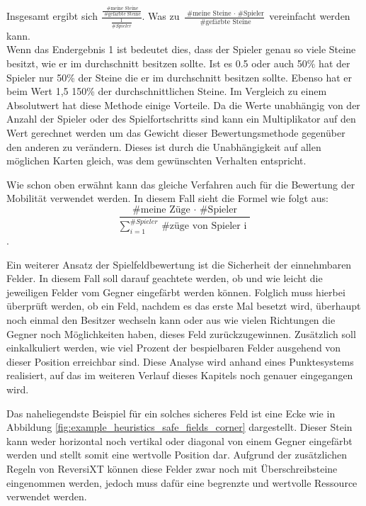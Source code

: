 \documentclass[12pt,a4paper,bibliography=totocnumbered,listof=totocnumbered]{article}
\begin{document}
Insgesamt ergibt sich
\( \frac{ \frac{\text{ \# meine Steine}}{\text{ \# gefärbte Steine}} }{ \frac{1}{ \# Spieler} } \).
Was zu
\( \frac{ \text{ \# meine Steine } \cdot \text{ \# Spieler} }{ \text{ \# gefärbte Steine} } \) 
vereinfacht werden kann.\\
Wenn das Endergebnis 1 ist bedeutet dies, dass der Spieler genau so viele Steine besitzt, wie er im durchschnitt besitzen sollte. Ist es 0.5 oder auch 50\% hat der Spieler nur 50\% der Steine die er im durchschnitt besitzen sollte. Ebenso hat er beim Wert 1,5 150\% der durchschnittlichen Steine.
Im Vergleich zu einem Absolutwert hat diese Methode einige Vorteile. Da die Werte unabhängig von der Anzahl der Spieler oder des Spielfortschritts sind  kann ein Multiplikator auf den Wert gerechnet werden um das Gewicht dieser Bewertungsmethode gegenüber den anderen zu verändern. Dieses ist durch die Unabhängigkeit auf allen möglichen Karten gleich, was dem gewünschten Verhalten entspricht.

Wie schon oben erwähnt kann das gleiche Verfahren auch für die Bewertung der Mobilität verwendet werden. In diesem Fall sieht die Formel wie folgt aus:
\[ \frac{ \text{ \# meine Züge } \cdot \text{ \# Spieler } }{ \sum_{i=1}^{ \#Spieler} \text{ \# züge von Spieler i } }  \].


Ein weiterer Ansatz der Spielfeldbewertung ist die \glqq Sicherheit\grqq{} der einnehmbaren Felder. In diesem Fall soll darauf geachtete werden, ob und wie leicht die jeweiligen Felder vom Gegner eingefärbt werden können. Folglich muss hierbei überprüft werden, ob ein Feld, nachdem es das erste Mal besetzt wird, überhaupt noch einmal den Besitzer wechseln kann oder aus wie vielen Richtungen die Gegner noch Möglichkeiten haben, dieses Feld zurückzugewinnen. Zusätzlich soll einkalkuliert werden, wie viel Prozent der bespielbaren Felder ausgehend von dieser Position erreichbar sind. Diese Analyse wird anhand eines Punktesystems realisiert, auf das im weiteren Verlauf dieses Kapitels noch genauer eingegangen wird.

Das naheliegendste Beispiel für ein solches sicheres Feld ist eine Ecke wie in Abbildung \ref{fig:example_heuristics_safe_fields_corner} dargestellt. Dieser Stein kann weder horizontal noch vertikal oder diagonal von einem Gegner eingefärbt werden und stellt somit eine wertvolle Position dar. Aufgrund der zusätzlichen Regeln von ReversiXT können diese Felder zwar noch mit Überschreibsteine eingenommen werden, jedoch muss dafür eine begrenzte und wertvolle Ressource verwendet werden.
\end{document}
